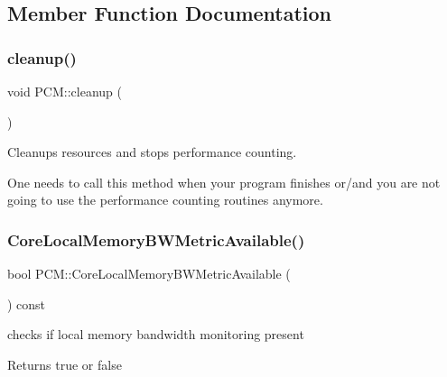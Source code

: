 \subsection{Member Function Documentation}
\mbox{\label{class_p_c_m_ac0c8d3764ff95840ece17d632de4df9b}} 
\subsubsection{\texorpdfstring{cleanup()}{cleanup()}}
{\footnotesize\ttfamily void P\+C\+M\+::cleanup (\begin{DoxyParamCaption}{ }\end{DoxyParamCaption})}



Cleanups resources and stops performance counting. 

One needs to call this method when your program finishes or/and you are not going to use the performance counting routines anymore. \mbox{\label{class_p_c_m_af0648834f063a6bd2ea88c61a2ba286d}} 
\subsubsection{\texorpdfstring{Core\+Local\+Memory\+B\+W\+Metric\+Available()}{CoreLocalMemoryBWMetricAvailable()}}
{\footnotesize\ttfamily bool P\+C\+M\+::\+Core\+Local\+Memory\+B\+W\+Metric\+Available (\begin{DoxyParamCaption}{ }\end{DoxyParamCaption}) const}



checks if local memory bandwidth monitoring present 

\begin{DoxyReturn}{Returns}
true or false 
\end{DoxyReturn}
\mbox{\label{class_p_c_m_a9b2b73d2af7c5a851e5c43df37d7fdb2}} 
